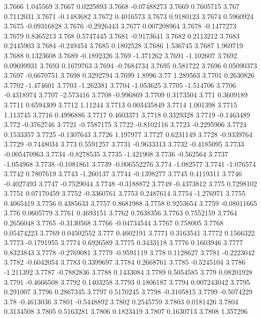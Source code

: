 3.7666  1.045569
3.7667  0.0225893
3.7668  -0.07488273
3.7669  0.7605715
3.767  0.7112031
3.7671  -0.1483682
3.7672  0.4016573
3.7673  0.9180123
3.7674  0.5960924
3.7675  -0.09316828
3.7676  -0.2926443
3.7677  0.007208964
3.7678  -0.1477273
3.7679  0.8365213
3.768  0.5747445
3.7681  -0.9173641
3.7682  0.2113212
3.7683  0.2445903
3.7684  -0.249454
3.7685  0.1802528
3.7686  1.536745
3.7687  1.969719
3.7688  0.1323608
3.7689  -0.1892326
3.769  -1.371262
3.7691  -1.102607
3.7692  0.09699931
3.7693  0.1679763
3.7694  -0.7684734
3.7695  0.581722
3.7696  0.05090373
3.7697  -0.6670751
3.7698  0.3292794
3.7699  1.8996
3.77  1.289563
3.7701  0.2630826
3.7702  -1.474601
3.7703  -1.262381
3.7704  -1.053625
3.7705  -1.514706
3.7706  -0.4318974
3.7707  -2.573416
3.7708  -0.996869
3.7709  0.3173504
3.771  0.3609189
3.7711  0.6594309
3.7712  1.11244
3.7713  0.003435849
3.7714  1.001398
3.7715  1.113745
3.7716  0.4996886
3.7717  0.4603371
3.7718  0.3329328
3.7719  -0.1463489
3.772  -0.3762746
3.7721  -0.7587175
3.7722  -0.8102116
3.7723  -0.2295906
3.7724  0.1533357
3.7725  -0.1307643
3.7726  1.197977
3.7727  0.6231149
3.7728  -0.9339764
3.7729  -0.7448034
3.773  0.5591257
3.7731  -0.9633313
3.7732  -0.4185095
3.7733  -0.005470963
3.7734  -0.8278535
3.7735  -1.421908
3.7736  -0.562564
3.7737  -1.054968
3.7738  -0.1081861
3.7739  -0.006552276
3.774  -1.082577
3.7741  -1.076574
3.7742  0.7807619
3.7743  -1.260137
3.7744  -0.1398277
3.7745  0.4119311
3.7746  -0.4027493
3.7747  -0.7529044
3.7748  -0.3188872
3.7749  -0.4373812
3.775  0.7298102
3.7751  0.07170459
3.7752  -0.3360761
3.7753  0.2487614
3.7754  -1.276971
3.7755  0.4065419
3.7756  0.4385633
3.7757  0.8681988
3.7758  0.9253654
3.7759  -0.08011665
3.776  0.0605779
3.7761  0.4693151
3.7762  0.7638356
3.7763  0.7552159
3.7764  0.2656048
3.7765  -0.3130568
3.7766  -0.04734544
3.7767  0.758005
3.7768  0.05474223
3.7769  0.04502552
3.777  0.4602191
3.7771  0.3163541
3.7772  0.1566322
3.7773  -0.1791955
3.7774  0.6926589
3.7775  0.3433118
3.7776  0.1603946
3.7777  0.8323843
3.7778  -0.2769081
3.7779  -0.9591119
3.778  0.1128627
3.7781  -0.2223042
3.7782  -0.6042054
3.7783  0.3399697
3.7784  0.2668761
3.7785  -0.5245104
3.7786  -1.211392
3.7787  -0.7882836
3.7788  0.1433084
3.7789  0.5054585
3.779  0.08201928
3.7791  -0.4666508
3.7792  0.1403258
3.7793  0.1806187
3.7794  0.007243042
3.7795  0.291007
3.7796  0.2867345
3.7797  0.5170245
3.7798  -0.3105815
3.7799  -0.5074229
3.78  -0.4613036
3.7801  -0.5448892
3.7802  0.2545759
3.7803  0.0181426
3.7804  0.3134508
3.7805  0.5163281
3.7806  0.1823419
3.7807  0.1630713
3.7808  1.357296
